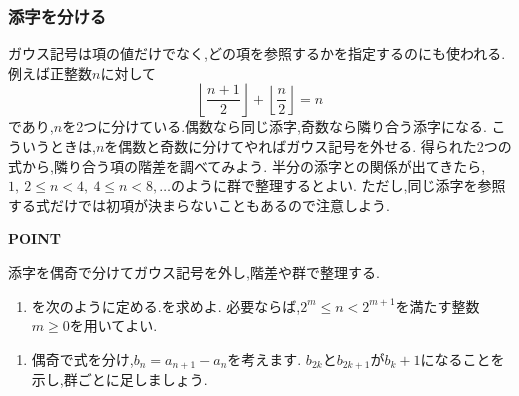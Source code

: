 \subsubsection{添字を分ける}\label{節：添字を分ける}
ガウス記号は項の値だけでなく,どの項を参照するかを指定するのにも使われる.
例えば正整数$n$に対して
\[
  \left\lfloor\frac{n+1}{2}\right\rfloor
  +\left\lfloor\frac n2\right\rfloor=n
\]
であり,$n$を2つに分けている.偶数なら同じ添字,奇数なら隣り合う添字になる.
こういうときは,$n$を偶数と奇数に分けてやればガウス記号を外せる.
得られた2つの式から,隣り合う項の階差を調べてみよう.
半分の添字との関係が出てきたら,$1,\ 2\le n<4,\ 4\le n<8,\ldots$のように群で整理するとよい.
ただし,同じ添字を参照する式だけでは初項が決まらないこともあるので注意しよう.

\begin{bookpoint}
  \textbf{POINT}\par
  添字を偶奇で分けてガウス記号を外し,階差や群で整理する.
\end{bookpoint}

\noindent {}\par\nobreak
\begin{enumerate}[label=(\arabic*),parsep=3pt,beginpenalty=10000,format=\bookitemlink{example-gauss-role-7}{problem}{hint}]
  \item {}を次のように定める.を求めよ.
    \BookMathLayout{            \[
        a_1=2,\qquad
        a_n=a_{\left\lfloor\frac{n+1}{2}\right\rfloor}
        +a_{\left\lfloor\frac n2\right\rfloor}+n-1
        \quad(n\ge2).
      \]}{            \[
        \begin{aligned}
          a_1&=2,\\
          a_n&=a_{\left\lfloor\frac{n+1}{2}\right\rfloor}
          +a_{\left\lfloor\frac n2\right\rfloor}+n-1
          \\              &\quad(n\ge2).
        \end{aligned}
      \]}
    必要ならば,$2^m\le n<2^{m+1}$を満たす整数$m\ge0$を用いてよい.
\end{enumerate}

\noindent {}\par\nobreak
\begin{enumerate}[label=(\arabic*),parsep=3pt,beginpenalty=10000,format=\bookitemlink{example-gauss-role-7}{hint}{answer}]
  \item 偶奇で式を分け,$b_n=a_{n+1}-a_n$を考えます.
    $b_{2k}$と$b_{2k+1}$が$b_k+1$になることを示し,群ごとに足しましょう.
\end{enumerate}

